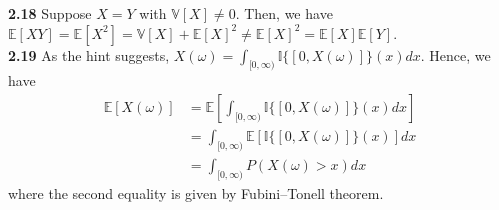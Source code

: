 \noindent\textbf{2.18} Suppose $X = Y$ with $\mathbb{V}[X] \neq 0$.
Then, we have $\mathbb{E}[X Y] = \mathbb{E}[X^2] = \mathbb{V}[X] + \mathbb{E}[X]^2 \neq \mathbb{E}[X]^2 = \mathbb{E}[X]\mathbb{E}[Y]$.\\


\noindent\textbf{2.19} As the hint suggests, $X(\omega)=\int_{[0, \infty)} \mathbb{I}\{[0, X(\omega)]\}(x) dx$.
Hence, we have
\begin{equation}
    \begin{split}
        \mathbb{E}[X(\omega)]
        &= \mathbb{E}[\int_{[0, \infty)} \mathbb{I}\{[0, X(\omega)]\}(x) dx]\\
        &= \int_{[0, \infty)} \mathbb{E}[\mathbb{I}\{[0, X(\omega)]\}(x)] dx\\
        &= \int_{[0, \infty)} P(X(\omega) > x) dx
    \end{split}
\end{equation}
where the second equality is given by Fubini–Tonell theorem.\\


